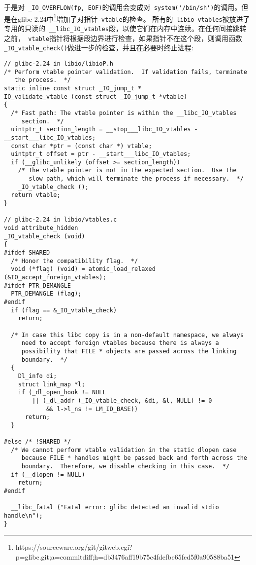 于是对\verb+ _IO_OVERFLOW(fp, EOF)+的调用会变成对\verb+ system('/bin/sh')+的调用。但是在glibc-2.24中\footnote{https://sourceware.org/git/gitweb.cgi?p=glibc.git;a=commitdiff;h=db3476aff19b75c4fdefbe65fcd5f0a90588ba51}增加了对指针\verb+ vtable+的检查。
所有的\verb+ libio vtables+被放进了专用的只读的\verb+ __libc_IO_vtables+段，以使它们在内存中连续。在任何间接跳转之前，\verb+ vtable+指针将根据段边界进行检查，如果指针不在这个段，则调用函数\verb+ _IO_vtable_check()+做进一步的检查，并且在必要时终止进程:
\begin{verbatim}
// glibc-2.24 in libio/libioP.h
/* Perform vtable pointer validation.  If validation fails, terminate
   the process.  */
static inline const struct _IO_jump_t *
IO_validate_vtable (const struct _IO_jump_t *vtable)
{
  /* Fast path: The vtable pointer is within the __libc_IO_vtables
     section.  */
  uintptr_t section_length = __stop___libc_IO_vtables - __start___libc_IO_vtables;
  const char *ptr = (const char *) vtable;
  uintptr_t offset = ptr - __start___libc_IO_vtables;
  if (__glibc_unlikely (offset >= section_length))
    /* The vtable pointer is not in the expected section.  Use the
       slow path, which will terminate the process if necessary.  */
    _IO_vtable_check ();
  return vtable;
}

// glibc-2.24 in libio/vtables.c
void attribute_hidden
_IO_vtable_check (void)
{
#ifdef SHARED
  /* Honor the compatibility flag.  */
  void (*flag) (void) = atomic_load_relaxed (&IO_accept_foreign_vtables);
#ifdef PTR_DEMANGLE
  PTR_DEMANGLE (flag);
#endif
  if (flag == &_IO_vtable_check)
    return;

  /* In case this libc copy is in a non-default namespace, we always
     need to accept foreign vtables because there is always a
     possibility that FILE * objects are passed across the linking
     boundary.  */
  {
    Dl_info di;
    struct link_map *l;
    if (_dl_open_hook != NULL
        || (_dl_addr (_IO_vtable_check, &di, &l, NULL) != 0
            && l->l_ns != LM_ID_BASE))
      return;
  }

#else /* !SHARED */
  /* We cannot perform vtable validation in the static dlopen case
     because FILE * handles might be passed back and forth across the
     boundary.  Therefore, we disable checking in this case.  */
  if (__dlopen != NULL)
    return;
#endif

  __libc_fatal ("Fatal error: glibc detected an invalid stdio handle\n");
}
\end{verbatim}

